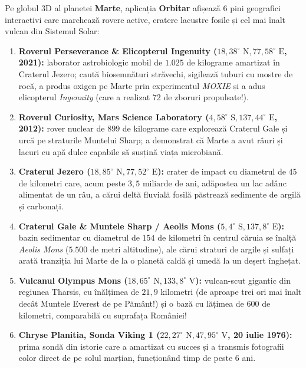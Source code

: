 \begin{tcolorbox}[orbitarcadet, title={\textbf{Atlasul Reperelor Geografice și al Roverelor de pe Marte în Orbitar (\texttt{SurfaceMarkers.ts})}}]
Pe globul 3D al planetei \textbf{Marte}, aplicația \textbf{Orbitar} afișează 6 pini geografici interactivi care marchează rovere active, cratere lacustre fosile și cel mai înalt vulcan din Sistemul Solar:
\begin{enumerate}[leftmargin=1.5em, itemsep=3pt]
  \item \textbf{Roverul Perseverance \& Elicopterul Ingenuity ($18{,}38^\circ\text{ N}, 77{,}58^\circ\text{ E}$, 2021):} laborator astrobiologic mobil de $1.025$ de kilograme amartizat în Craterul Jezero; caută biosemnături străvechi, sigilează tuburi cu mostre de rocă, a produs oxigen pe Marte prin experimentul \emph{MOXIE} și a adus elicopterul \emph{Ingenuity} (care a realizat 72 de zboruri propulsate!).
  \item \textbf{Roverul Curiosity, Mars Science Laboratory ($4{,}58^\circ\text{ S}, 137{,}44^\circ\text{ E}$, 2012):} rover nuclear de $899$ de kilograme care explorează Craterul Gale și urcă pe straturile Muntelui Sharp; a demonstrat că Marte a avut râuri și lacuri cu apă dulce capabile să susțină viața microbiană.
  \item \textbf{Craterul Jezero ($18{,}85^\circ\text{ N}, 77{,}52^\circ\text{ E}$):} crater de impact cu diametrul de $45$ de kilometri care, acum peste $3{,}5\text{ miliarde de ani}$, adăpostea un lac adânc alimentat de un râu, a cărui deltă fluvială fosilă păstrează sedimente de argilă și carbonați.
  \item \textbf{Craterul Gale \& Muntele Sharp / Aeolis Mons ($5{,}4^\circ\text{ S}, 137{,}8^\circ\text{ E}$):} bazin sedimentar cu diametrul de $154$ de kilometri în centrul căruia se înalță \emph{Aeolis Mons} ($5.500$ de metri altitudine), ale cărui straturi de argile și sulfați arată tranziția lui Marte de la o planetă caldă și umedă la un deșert înghețat.
  \item \textbf{Vulcanul Olympus Mons ($18{,}65^\circ\text{ N}, 133{,}8^\circ\text{ V}$):} vulcan-scut gigantic din regiunea Tharsis, cu înălțimea de $21{,}9$ kilometri (de aproape trei ori mai înalt decât Muntele Everest de pe Pământ!) și o bază cu lățimea de $600$ de kilometri, comparabilă cu suprafața României!
  \item \textbf{Chryse Planitia, Sonda Viking 1 ($22{,}27^\circ\text{ N}, 47{,}95^\circ\text{ V}$, 20 iulie 1976):} prima sondă din istorie care a amartizat cu succes și a transmis fotografii color direct de pe solul marțian, funcționând timp de peste 6 ani.
\end{enumerate}
\end{tcolorbox}

